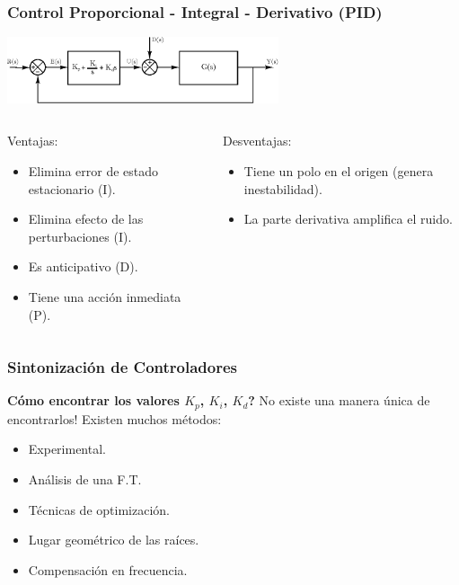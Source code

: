 \documentclass[aspectratio=169,handout]{beamer}
\theoremstyle{definition}
\theoremstyle{plain}
\theoremstyle{remark}
\begin{document}
\begin{frame}[<+->]\frametitle{Control Proporcional - Integral - Derivativo (PID)}
\begin{center}
  \includegraphics[width=8cm]{images/PIDcontroller.eps}
\end{center}
\begin{columns}
\begin{column}{0.5\textwidth}
Ventajas:
\begin{itemize}
  \item Elimina error de estado estacionario (I).
  \item Elimina efecto de las perturbaciones (I).
  \item Es anticipativo (D).
  \item Tiene una acción inmediata (P).
\end{itemize}
\end{column}
\begin{column}{0.5\textwidth}
Desventajas:
\begin{itemize}
  \item Tiene un polo en el origen (genera inestabilidad).
  \item La parte derivativa amplifica el ruido.
\end{itemize}
\end{column}
\end{columns}
\end{frame}

\begin{frame}[<+->]\frametitle{Sintonización de Controladores}
\textbf{Cómo encontrar los valores $K_p$, $K_i$, $K_d$?} No existe una manera única de encontrarlos! Existen muchos métodos:
\begin{itemize}
  \item Experimental.
  \item Análisis de una F.T.
  \item Técnicas de optimización.
  \item Lugar geométrico de las raíces.
  \item Compensación en frecuencia.
\end{itemize}
\end{frame}
\end{document}
